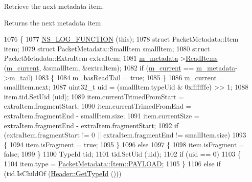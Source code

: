 Retrieve the next metadata item. 

\begin{DoxyReturn}{Returns}
the next metadata item 
\end{DoxyReturn}

\begin{DoxyCode}
1076 \{
1077   \hyperlink{log-macros-disabled_8h_a90b90d5bad1f39cb1b64923ea94c0761}{NS\_LOG\_FUNCTION} (\textcolor{keyword}{this});
1078   \textcolor{keyword}{struct }PacketMetadata::Item item;
1079   \textcolor{keyword}{struct }PacketMetadata::SmallItem smallItem;
1080   \textcolor{keyword}{struct }PacketMetadata::ExtraItem extraItem;
1081   \hyperlink{classns3_1_1PacketMetadata_1_1ItemIterator_a6a91c392408e77624613663198f269a6}{m\_metadata}->\hyperlink{classns3_1_1PacketMetadata_a3719ad2c32313a9a1c74462322e8b517}{ReadItems} (\hyperlink{classns3_1_1PacketMetadata_1_1ItemIterator_a05a394b22a469fcd9adb8cf23916c437}{m\_current}, &smallItem, &extraItem);
1082   \textcolor{keywordflow}{if} (\hyperlink{classns3_1_1PacketMetadata_1_1ItemIterator_a05a394b22a469fcd9adb8cf23916c437}{m\_current} == \hyperlink{classns3_1_1PacketMetadata_1_1ItemIterator_a6a91c392408e77624613663198f269a6}{m\_metadata}->\hyperlink{classns3_1_1PacketMetadata_ad24a659e236af7b98c475c97c4f60db9}{m\_tail})
1083     \{
1084       \hyperlink{classns3_1_1PacketMetadata_1_1ItemIterator_a8ed1eb05c698cb72588f997f72e2788e}{m\_hasReadTail} = \textcolor{keyword}{true};
1085     \}
1086   \hyperlink{classns3_1_1PacketMetadata_1_1ItemIterator_a05a394b22a469fcd9adb8cf23916c437}{m\_current} = smallItem.next;
1087   uint32\_t uid = (smallItem.typeUid & 0xfffffffe) >> 1;
1088   item.tid.SetUid (uid);
1089   item.currentTrimedFromStart = extraItem.fragmentStart;
1090   item.currentTrimedFromEnd = extraItem.fragmentEnd - smallItem.size;
1091   item.currentSize = extraItem.fragmentEnd - extraItem.fragmentStart;
1092   \textcolor{keywordflow}{if} (extraItem.fragmentStart != 0 || extraItem.fragmentEnd != smallItem.size)
1093     \{
1094       item.isFragment = \textcolor{keyword}{true};
1095     \}
1096   \textcolor{keywordflow}{else}
1097     \{
1098       item.isFragment = \textcolor{keyword}{false};
1099     \}
1100   TypeId tid;
1101   tid.SetUid (uid);
1102   \textcolor{keywordflow}{if} (uid == 0)
1103     \{
1104       item.type = \hyperlink{structns3_1_1PacketMetadata_1_1Item_ab0a06781a8793079afeab58a9a9b3174ac2bc28ee0adb79d428d3f5a11be52f80}{PacketMetadata::Item::PAYLOAD};
1105     \}
1106   \textcolor{keywordflow}{else} \textcolor{keywordflow}{if} (tid.IsChildOf (\hyperlink{classns3_1_1Header_a19c6ed8b6d49bddfe37dc99a7b18d22b}{Header::GetTypeId} ()))

\end{DoxyCode}
